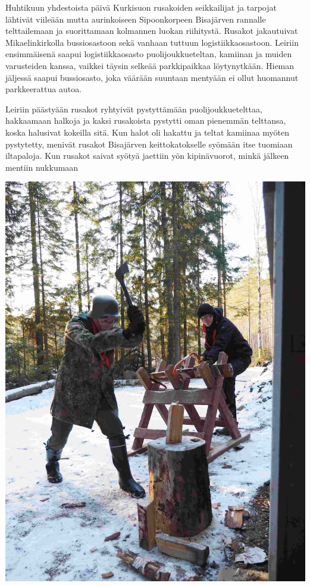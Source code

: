 \begin{multicols}{2}

\noindent Huhtikuun yhdestoista päivä Kurkisuon rusakoiden seikkailijat ja tarpojat
lähtivät viileään mutta aurinkoiseen Sipoonkorpeen Bisajärven rannalle
telttailemaan ja suorittamaan kolmannen luokan riihitystä. Rusakot jakautuivat
Mikaelinkirkolla bussiosastoon sekä vanhaan tuttuun logistiikkaosastoon.
Leiriin ensimmäisenä saapui logistiikkaosasto puolijoukkueteltan, kamiinan ja
muiden varusteiden kanssa, vaikkei täysin selkeää parkkipaikkaa löytynytkään.
Hieman jäljessä saapui bussiosasto, joka väärään suuntaan mentyään ei ollut
huomannut parkkeerattua autoa.

Leiriin päästyään rusakot ryhtyivät pystyttämään puolijoukkuetelttaa,
hakkaamaan halkoja ja kaksi rusakoista pystytti oman pienemmän telttansa, koska
halusivat kokeilla sitä. Kun halot oli hakattu ja teltat kamiinaa myöten
pystytetty, menivät rusakot Bisajärven keittokatokselle syömään itse tuomiaan
iltapaloja. Kun rusakot saivat syötyä jaettiin yön kipinävuorot, minkä jälkeen
mentiin nukkumaan

\vspace*{-0.16cm}

\columnbreak

\begin{center}
	\noindent\includegraphics[height=0.9\linewidth,angle=90]{assets/telttaretki5}
\end{center}


\end{multicols}
